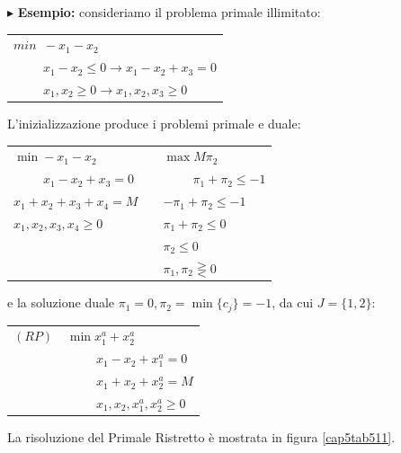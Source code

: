 \documentclass[11pt]{book}
\begin{document}
\vspace{11pt}$\blacktriangleright$ {\bf Esempio:} consideriamo il
problema primale illimitato:

\vspace{11pt}
\begin{center}
\begin{tabular}{l}
$min\phantom{a}-x_1-x_2$ \\
$\phantom{mina}x_1-x_2 \leq 0 \rightarrow x_1 - x_2 + x_3 = 0$ \\
$\phantom{mina}x_1,x_2 \geq 0 \rightarrow x_1,x_2,x_3 \geq 0$ \\
\end{tabular}
\end{center}
\vspace{11pt}

L'inizializzazione produce i problemi primale e duale:

\vspace{11pt}
\begin{tabular}{lp{3cm}l}
$\min -x_1-x_2$ & & $\max M\pi_2$ \\
$\phantom{mina}x_1-x_2+x_3 = 0$ && $\phantom{mina}\pi_1+\pi_2 \leq -1$
  \\
$x_1 + x_2 + x_3 + x_4 = M$ && $-\pi_1 + \pi_2 \leq -1$ \\
$x_1, x_2, x_3, x_4 \geq 0$ && $\pi_1 + \pi_2 \leq 0$ \\
& & $\pi_2\leq0$\\
& & $\pi_1,\pi_2 \gtreqless 0$
\end{tabular}
\vspace{11pt}

e la soluzione duale $\pi_1 = 0, \pi_2 = \min\{ c_j \} = -1$, da cui
$J = \{1,2\}$:

\vspace{11pt}
\begin{center}
\begin{tabular}{l}
$(RP)\phantom{aa}\min x_1^a + x_2^a$ \\
$\phantom{(RP)aamina}x_1 - x_2 + x_1^a = 0$ \\
$\phantom{(RP)aamina}x_1 + x_2 + x_2^a = M$ \\
$\phantom{(RP)aamina}x_1, x_2, x_1^a, x_2^a \geq 0$ \\
\end{tabular}
\end{center}
\vspace{11pt}

La risoluzione del Primale Ristretto \`e mostrata in figura
\ref{cap5tab511}.
\end{document}
